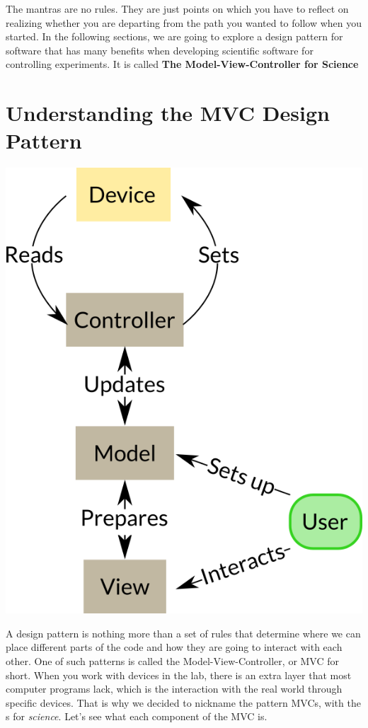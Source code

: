 The mantras are no rules. They are just points on which you have to reflect on realizing whether you are departing from the path you wanted to follow when you started. In the following sections, we are going to explore a design pattern for software that has many benefits when developing scientific software for controlling experiments. It is called \textbf{The Model-View-Controller for Science}

\section{Understanding the MVC Design Pattern}\label{sec:mvc}
\begin{center}
\includegraphics{images/Chapter_04/MVCs.png}
\end{center}

A design pattern is nothing more than a set of rules that determine where we can place different parts of the code and how they are going to interact with each other. One of such patterns is called the Model-View-Controller, or MVC for short. When you work with devices in the lab, there is an extra layer that most computer programs lack, which is the interaction with the real world through specific devices. That is why we decided to nickname the pattern MVCs, with the s for \emph{science}. Let's see what each component of the MVC is.

